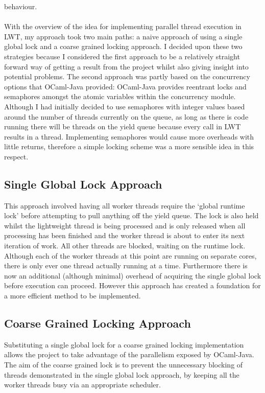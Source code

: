 \documentclass[12pt,twoside,notitlepage]{report}
\begin{document}
behaviour.
\hfill\\

\hfill\\
With the overview of the idea for implementing parallel thread execution in LWT, my approach took two main paths: a naive approach of using a single global lock and a coarse grained locking approach. I decided upon these two strategies
because I considered the first approach to be a relatively straight forward way of getting a result from the project whilst also giving insight into potential problems. The second approach was partly based on the concurrency options
that OCaml-Java provided: OCaml-Java provides reentrant locks and semaphores amongst the atomic variables within the concurrency module. Although I had initially decided to use semaphores with integer values based around the
number of threads currently on the queue, as long as there is code running there will be threads on the yield queue because every call in LWT results in a thread. Implementing semaphores would cause more overheads with little
returns, therefore a simple locking scheme was a more sensible idea in this respect.

\subsection{Single Global Lock Approach}
\label{subsec:naive_runtime_lock_apprach}
%
%
This approach involved having all worker threads require the `global runtime lock' before attempting to pull anything off the yield queue. The lock is also held whilst the lightweight thread is being processed and is only released when all
processing has been finished and the worker thread is about to enter its next iteration of work. All other threads are blocked, waiting on the runtime lock. Although each of the worker threads at this point are running on separate
cores, there is only ever one thread actually running at a time. Furthermore there is now an additional (although minimal) overhead of acquiring the single global lock before execution can proceed. However this approach has created a
foundation for a more efficient method to be implemented.
%
%
\subsection{Coarse Grained Locking Approach}
\label{subsec:coarse_grained_locking_apprach}
%
%
Substituting a single global lock for a coarse grained locking implementation allows the project to take advantage of the parallelism exposed by OCaml-Java. The aim of the coarse grained lock is
to prevent the unnecessary blocking of threads demonstrated in the single global lock approach, by keeping all the worker threads busy via an appropriate scheduler.
\end{document}
